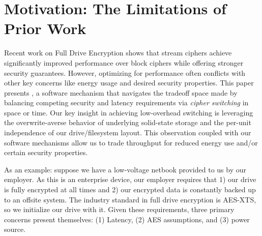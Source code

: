 



\title{\TITLE}

\date{}
\maketitle

\thispagestyle{empty}


\section{Motivation: The Limitations of Prior Work}
\label{sec:motivation}

Recent work on Full Drive Encryption shows that stream ciphers achieve
significantly improved performance over block ciphers while offering
stronger security guarantees. However, optimizing for performance
often conflicts with other key concerns like energy usage and desired
security properties.  This paper presents \sys, a software mechanism that
navigates the tradeoff space made by balancing competing security and
latency requirements via \emph{cipher switching} in space or time. Our
key insight in achieving low-overhead switching is leveraging the
overwrite-averse behavior of underlying solid-state storage and the
per-unit independence of our drive/filesystem layout. This observation
coupled with our software mechanisms allow us to trade throughput for
reduced energy use and/or certain security properties.

As an example: suppose we have a low-voltage netbook provided to us by
our employer. As this is an enterprise device, our employer requires
that 1) our drive is fully encrypted at all times and 2) our encrypted
data is constantly backed up to an offsite system. The industry
standard in full drive encryption is AES-XTS, so we initialize our
drive with it. Given these requirements, three primary concerns
present themselves: (1) Latency, (2) AES assumptions, and (3) power
source.

